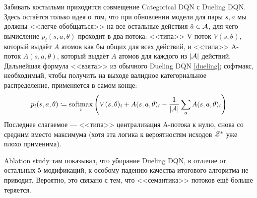 Забивать костыльми приходится совмещение Categorical DQN с Dueling DQN. Здесь остаётся только идея о том, что при обновлении модели для пары $s, a$ мы должны <<легче обобщаться>> на все остальные действия $\hat{a} \in \mathcal{A}$, для чего вычисление $p_i(s, a, \theta)$ проходит в два потока: <<типа>> V-поток $V(s, \theta)$, который выдаёт $A$ атомов как бы общих для всех действий, и <<типа>> A-поток $A(s, a, \theta)$, который выдаёт $A$ атомов для каждого из $|\mathcal{A}|$ действий. Дальнейшая формула <<взята>> из обычного Dueling DQN \eqref{dueling}; софтмакс, необходимый, чтобы получить на выходе валидное категориальное распределение, применяется в самом конце:
\begin{equation}\label{rainbowdueling}
p_i(s, a, \theta) \coloneqq \operatorname*{softmax}\limits_{i} \left( V(s, \theta)_i + A(s, a, \theta)_i - \frac{1}{|\mathcal{A}|}\sum_a A(s, a, \theta)_i \right)
\end{equation}
Последнее слагаемое --- <<типа>> централизация A-потока к нулю, снова со средним вместо максимума (хотя эта логика к вероятностям исходов $\mathcal{Z}^*$ уже плохо применима).

\begin{remark}
Ablation study там показывал, что убирание Dueling DQN, в отличие от остальных 5 модификаций, к особому падению качества итогового алгоритма не приводит. Вероятно, это связано с тем, что <<семантика>> потоков ещё больше теряется.
\end{remark}


